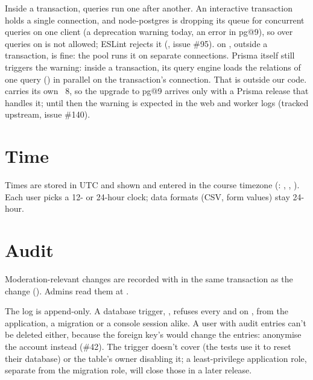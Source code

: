 Inside a transaction, queries run one after another. An interactive transaction holds a single
connection, and node-postgres is dropping its queue for concurrent queries on one client (a
deprecation warning today, an error in pg@9), so  over queries on 
is not allowed; ESLint rejects it (, issue \#95).  on
, outside a transaction, is fine: the pool runs it on separate connections.
Prisma itself still triggers the warning: inside a transaction, its query engine loads the
relations of one query () in parallel on the transaction's connection. That is
outside our code.  carries its own ~8, so the upgrade to pg@9
arrives only with a Prisma release that handles it; until then the warning is expected in the
web and worker logs (tracked upstream, issue \#140).

\section{Time}
Times are stored in UTC and shown and entered in the course timezone (:
, , ). Each user picks a 12- or 24-hour clock;
data formats (CSV, form values) stay 24-hour.

\section{Audit}
Moderation-relevant changes are recorded with  in the same transaction
as the change (). Admins read them at .

The log is append-only. A database trigger, , refuses every
 and  on , from the application, a migration or a
console session alike. A user with audit entries can't be deleted either, because the
foreign key's  would change the entries: anonymise the account instead (\#42).
The trigger doesn't cover  (the tests use it to reset their database) or the
table's owner disabling it; a least-privilege application role, separate from the migration
role, will close those in a later release.

